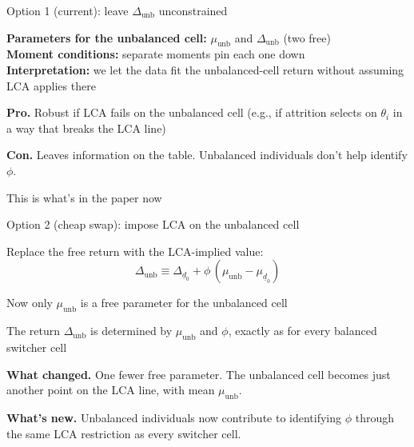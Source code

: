 \documentclass[10pt,aspectratio=169]{beamer}
\newcommand{\mudz}{\mu_{\underline{d}_0}}
\newcommand{\munb}{\mu_{\mathrm{unb}}}
\newcommand{\Deltadz}{\Delta_{\underline{d}_0}}
\newcommand{\Deltaunb}{\Delta_{\mathrm{unb}}}
\begin{document}
\begin{frame}{Option 1 (current): leave $\Deltaunb$ unconstrained}

  \begin{center}
    \begin{minipage}{0.85\textwidth}
    \textbf{Parameters for the unbalanced cell:} $\munb$ and $\Deltaunb$ (two free)\\[0.3em]
    \textbf{Moment conditions:} separate moments pin each one down\\[0.3em]
    \textbf{Interpretation:} we let the data fit the unbalanced-cell return without assuming LCA applies there
    \end{minipage}
  \end{center}

  \vspace{0.9em}
  \textbf{Pro.} Robust if LCA fails on the unbalanced cell (e.g., if attrition selects on $\theta_i$ in a way that breaks the LCA line)

  \vspace{0.5em}
  \textbf{Con.} Leaves information on the table. Unbalanced individuals don't help identify $\phi$.

  \vspace{0.5em}
  This is what's in the paper now

\end{frame}

\begin{frame}{Option 2 (cheap swap): impose LCA on the unbalanced cell}

  Replace the free return with the LCA-implied value:
  \[
    \Deltaunb \equiv \Deltadz + \phi\,(\munb - \mudz)
  \]

  \vspace{0.6em}
  Now only $\munb$ is a free parameter for the unbalanced cell

  The return $\Deltaunb$ is determined by $\munb$ and $\phi$, exactly as for every balanced switcher cell

  \vspace{1em}
  \textbf{What changed.} One fewer free parameter. The unbalanced cell becomes just another point on the LCA line, with mean $\munb$.

  \vspace{0.5em}
  \textbf{What's new.} Unbalanced individuals now contribute to identifying $\phi$ through the same LCA restriction as every switcher cell.

\end{frame}
\end{document}
